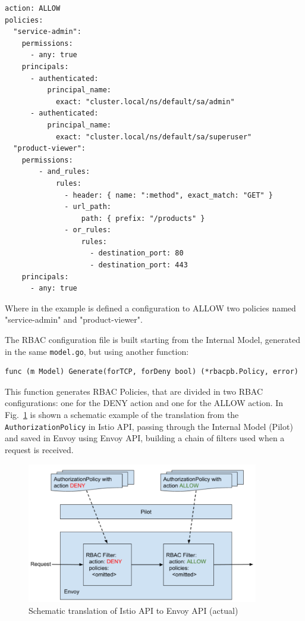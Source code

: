 \begin{lstlisting}
action: ALLOW
policies:
  "service-admin":
    permissions:
      - any: true
    principals:
      - authenticated:
          principal_name:
            exact: "cluster.local/ns/default/sa/admin"
      - authenticated:
          principal_name:
            exact: "cluster.local/ns/default/sa/superuser"
  "product-viewer":
    permissions:
        - and_rules:
            rules:
              - header: { name: ":method", exact_match: "GET" }
              - url_path:
                  path: { prefix: "/products" }
              - or_rules:
                  rules:
                    - destination_port: 80
                    - destination_port: 443
    principals:
      - any: true
\end{lstlisting}

\noindent Where in the example is defined a configuration to ALLOW two policies named "service-admin" and "product-viewer".

The RBAC configuration file is built starting from the Internal Model, generated in the same \texttt{model.go}, but using another function:
\begin{lstlisting}[title=\href{https://github.com/istio/istio/blob/4e6e7f49375d84bb35ee614c6b7d38b6c2fd3e7b/pilot/pkg/security/authz/model/model.go\#L167-L196}{GitHub permalink}]
func (m Model) Generate(forTCP, forDeny bool) (*rbacpb.Policy, error)
\end{lstlisting}

\noindent This function generates RBAC Policies, that are divided in two RBAC configurations: one for the DENY action and one for the ALLOW action. In Fig.~\ref{fig:rbac-filter} is shown a schematic example of the translation from the \texttt{AuthorizationPolicy} in Istio API, passing through the Internal Model (Pilot) and saved in Envoy using Envoy API, building a chain of filters used when a request is received.

\begin{figure}[ht]
    \centering
    \includegraphics[width=0.9\textwidth]{chapters/images/chp3/rbac-filter.png}
    \caption{Schematic translation of Istio API to Envoy API (actual)}
    \label{fig:rbac-filter}
\end{figure}

